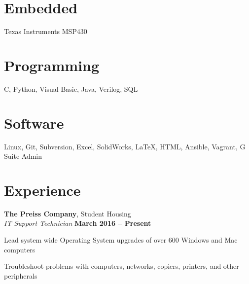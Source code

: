 \documentclass[margin,line]{resume}
\begin{document}
\address{4232 Palafox Ct. Raleigh, NC 27604
	\hspace{7mm}
	\Mobilefone \hspace{1mm}(704) 799-5153
	\hspace{7mm}
	\Letter \hspace{.1mm}
	\href{mailto:jesseaster1@gmail.com}{jesseaster1@gmail.com}
}


\begin{resume}

   
    \section{\mysidestyle Embedded}
    Texas Instruments MSP430
    \vspace{-5mm}
    
    \section{\mysidestyle Programming}
    C, Python, Visual Basic, Java, Verilog, SQL
    \vspace{-5mm}

    \section{\mysidestyle Software}
    Linux, Git, Subversion, Excel, SolidWorks, \LaTeX, HTML, Ansible, Vagrant, G Suite Admin

    \section{\mysidestyle Experience}


    \textbf{The Preiss Company}, Student Housing\\
    \textsl{IT Support Technician}  \hfill \textbf{March 2016 -- Present}\\
    \vspace{-4mm}
    \begin{list2}
    \item Lead system wide Operating System upgrades of over 600 Windows and Mac computers
    \item Troubleshoot problems with computers, networks, copiers, printers, and other peripherals


\end{list2}
\end{resume}
\end{document}
